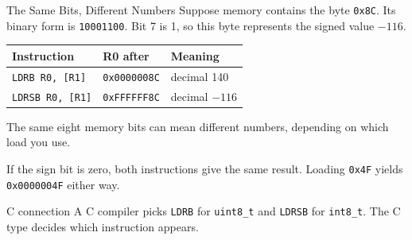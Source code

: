 \documentclass[9pt,aspectratio=169,xcolor=table]{beamer}
\begin{document}
\begin{frame}[fragile]{The Same Bits, Different Numbers}
    \leavevmode
    {\small Suppose memory contains the byte \texttt{0x8C}. Its binary form
    is \texttt{10001100}. Bit 7 is 1, so this byte represents the signed
    value \alert{$-116$}.}

    \vspace{3mm}
    \begin{center}
    {\small
    \striped
    \begin{tabular}{@{}l l R{.42\textwidth}@{}}
        \toprule
        \textbf{Instruction} & \textbf{R0 after} & \textbf{Meaning} \\
        \midrule
        \texttt{LDRB  R0, [R1]} & \texttt{0x0000008C} & decimal 140 \\
        \texttt{LDRSB R0, [R1]} & \texttt{0xFFFFFF8C} & decimal $-116$ \\
        \bottomrule
    \end{tabular}}
    \end{center}

    \vspace{3mm}
    {\small The \alert{same eight memory bits} can mean different numbers,
    depending on which load you use.}

    \vspace{2mm}
    {\small If the sign bit is zero, both instructions give the same
    result. Loading \texttt{0x4F} yields \texttt{0x0000004F} either way.}

    \vspace{3mm}
    \begin{block}{C connection}
        A C compiler picks \texttt{LDRB} for \texttt{uint8\_t} and
        \texttt{LDRSB} for \texttt{int8\_t}. The C type decides which
        instruction appears.
    \end{block}
\end{frame}
\end{document}
